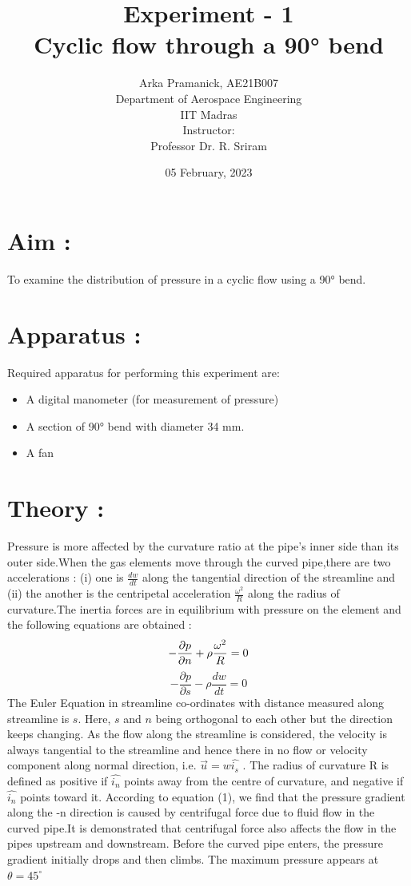 \documentclass[12pt,a4paper]{article}
\title{Experiment - 1\\Cyclic flow through a 90° bend}
\author{Arka Pramanick, AE21B007\\ Department of Aerospace Engineering\\ IIT Madras\\[3ex] Instructor:\\ \large Professor Dr. R. Sriram}
\date{05 February, 2023}
\begin{document}
\maketitle

\hline

\section{Aim :}
To examine the distribution of pressure in a cyclic flow using a 90° bend.
\section{Apparatus :}
Required apparatus for performing this experiment are:
\begin{itemize}
    \item A digital manometer (for measurement of pressure)
    \item A section of 90° bend with diameter 34 mm.
    \item A fan
\end{itemize}
\section{Theory :}
Pressure is more affected by the curvature ratio at the pipe's inner side than its outer side.When the gas elements move through the curved pipe,there are two accelerations : (i) one is $\frac{dw}{dt}$ along the tangential direction of the streamline and (ii) the another is the centripetal acceleration $\frac{\omega^2}{R}$ along the radius of curvature.The inertia forces are in equilibrium with pressure on the element and the following equations are obtained :
\begin{equation}
    -\frac{\partial p}{\partial n}+\rho \frac{\omega^2}{R} = 0\\
\end{equation}
\begin{equation}
    -\frac{\partial p}{\partial s}-\rho \frac{dw}{dt} = 0
\end{equation}
The Euler Equation in streamline co-ordinates with distance measured along streamline is $s$. Here, $s$ and $n$ being orthogonal to each other but the direction keeps changing.
As the flow along the streamline is considered, the velocity is always tangential to the streamline and hence there in no flow or velocity component along normal direction, i.e. $\Vec{u}= w\hat{i_s}$ . The radius of curvature R is defined as positive if $\hat{i_n}$ points away from the centre of curvature, and negative if $\hat{i_n}$ points toward it.
According to equation (1), we find that the pressure gradient along the -n direction is caused by centrifugal force due to fluid flow in the curved pipe.It is demonstrated that centrifugal force also affects the flow in the pipes upstream and downstream. Before the curved pipe enters, the pressure gradient initially drops and then climbs. The maximum pressure appears at $\theta=45^{\circ}$
\end{document}
